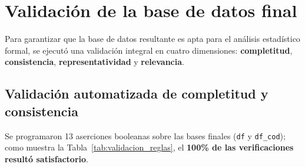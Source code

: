 \documentclass[12pt,letterpaper,oneside]{report}
\begin{document}
\section{Validación de la base de datos final}
\label{sec:validacion}

Para garantizar que la base de datos resultante es apta para el análisis estadístico formal, se ejecutó una validación integral en cuatro dimensiones: \textbf{completitud}, \textbf{consistencia}, \textbf{representatividad} y \textbf{relevancia}.

\subsection{Validación automatizada de completitud y consistencia}

Se programaron 13 aserciones booleanas sobre las bases finales (\texttt{df} y \texttt{df\_cod}); como muestra la Tabla~\ref{tab:validacion_reglas}, el \textbf{100\% de las verificaciones resultó satisfactorio}.
\end{document}
